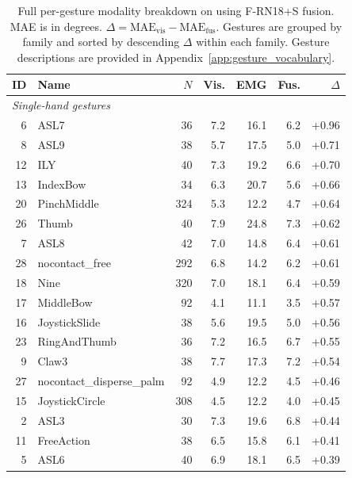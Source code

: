 \begin{table}[h]
\centering
\caption{Full per-gesture modality breakdown on \dataset{} using F-RN18+S fusion. MAE is in degrees.
$\Delta = \text{MAE}_\text{vis} - \text{MAE}_\text{fus}$.
Gestures are grouped by family and sorted by descending $\Delta$ within each family. Gesture descriptions are provided in Appendix~\ref{app:gesture_vocabulary}.}
\label{tab:per_gesture_full}
\scriptsize
\setlength{\tabcolsep}{3.0pt}
\renewcommand{\arraystretch}{1.02}
\begin{tabular}{rlrrrrr}
\toprule
ID & Name & $N$ & Vis. & EMG & Fus. & $\Delta$ \\
\midrule

\multicolumn{7}{l}{\textit{Single-hand gestures}} \\
6  & ASL7                    & 36  & 7.2 & 16.1 & 6.2 & +0.96 \\
8  & ASL9                    & 38  & 5.7 & 17.5 & 5.0 & +0.71 \\
12 & ILY                     & 40  & 7.3 & 19.2 & 6.6 & +0.70 \\
13 & IndexBow                & 34  & 6.3 & 20.7 & 5.6 & +0.66 \\
20 & PinchMiddle             & 324 & 5.3 & 12.2 & 4.7 & +0.64 \\
26 & Thumb                   & 40  & 7.9 & 24.8 & 7.3 & +0.62 \\
7  & ASL8                    & 42  & 7.0 & 14.8 & 6.4 & +0.61 \\
28 & nocontact\_free          & 292 & 6.8 & 14.2 & 6.2 & +0.61 \\
18 & Nine                    & 320 & 7.0 & 18.1 & 6.4 & +0.59 \\
17 & MiddleBow               & 92  & 4.1 & 11.1 & 3.5 & +0.57 \\
16 & JoystickSlide           & 38  & 5.6 & 19.5 & 5.0 & +0.56 \\
23 & RingAndThumb            & 36  & 7.2 & 16.5 & 6.7 & +0.55 \\
9  & Claw3                   & 38  & 7.7 & 17.3 & 7.2 & +0.54 \\
27 & nocontact\_disperse\_palm & 92 & 4.9 & 12.2 & 4.5 & +0.46 \\
15 & JoystickCircle          & 308 & 4.5 & 12.2 & 4.0 & +0.45 \\
2  & ASL3                    & 30  & 7.3 & 19.6 & 6.8 & +0.44 \\
11 & FreeAction              & 38  & 6.5 & 15.8 & 6.1 & +0.41 \\
5  & ASL6                    & 40  & 6.9 & 18.1 & 6.5 & +0.39 \\

\end{tabular}
\end{table}
